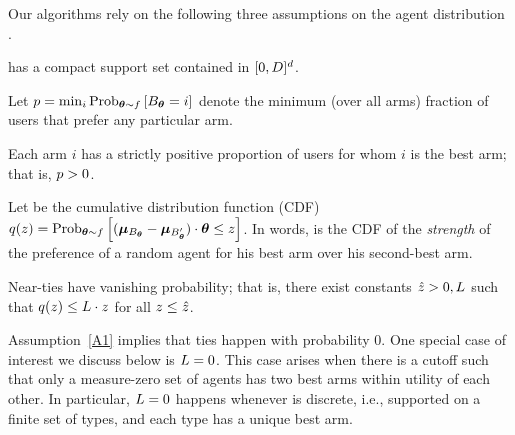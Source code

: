 Our algorithms rely on the following three assumptions on the agent distribution
\AgentDist.

\begin{assumption} \label{A2}
\AgentDist has a compact support set contained in $[0,D]^d$.
\end{assumption}

Let $\MinProb = \min_{i} \Prob[\AgV \sim \AgentDist]{\Best{\AgV} = i}$
denote the minimum (over all arms) fraction of users that prefer any
particular arm.

\begin{assumption} \label{A3}
Each arm $i$ has a strictly positive proportion of users for whom $i$
is the best arm; that is, $p > 0$.
\end{assumption}



Let  be the cumulative distribution function (CDF)
$\AlmostTied{z} = \Prob[\AgV \sim \AgentDist]{%
  (\ArmV{\Best{\AgV}}-\ArmV{\Second{\AgV}}) \cdot \AgV \leq z}$.
In words,  is the CDF of the \emph{strength} of the
preference of a random agent for his best arm over his second-best arm.

\begin{assumption} \label{A1}
Near-ties have vanishing probability; 
that is, there exist constants $\hat{z} > 0, L$ such that 
$q(z) \leq L \cdot z$ for all $z \leq \hat{z}$.
\end{assumption}

Assumption~\ref{A1} implies that ties happen with probability $0$.
One special case of interest we discuss below is
$L = 0$. This case arises when there is a cutoff
\TieCutoff such that only a measure-zero set of agents has two best arms
within utility \TieCutoff of each other.
In particular, $L = 0$ happens whenever \AgentDist is discrete,
i.e., supported on a finite set of types,
and each type has a unique best arm.

